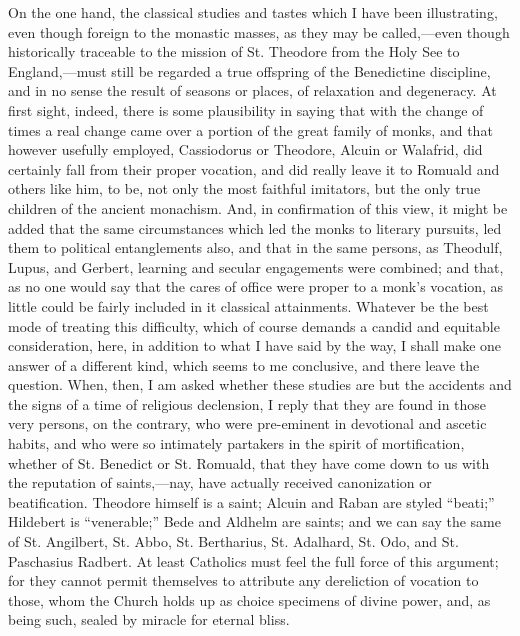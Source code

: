 On the one hand, the classical studies and tastes which I have been
illustrating, even though foreign to the monastic masses, as they may
be called,—even though historically traceable to the mission of St.
Theodore from the Holy See to England,—must still be regarded a true
offspring of the Benedictine discipline, and in no sense the result of
seasons or places, of relaxation and degeneracy. At first sight,
indeed, there is some plausibility in saying that with the change of
times a real change came over a portion of the great family of monks,
and that however usefully employed, Cassiodorus or Theodore, Alcuin or
Walafrid, did certainly fall from their proper vocation, and did
really leave it to Romuald and others like him, to be, not only the
most faithful imitators, but the only true children of the ancient
monachism. And, in confirmation of this view, it might be added that
the same circumstances which led the monks to literary pursuits, led
them to political entanglements also, and that in the same persons, as
Theodulf, Lupus, and Gerbert, learning and secular engagements were
combined; and that, as no one would say that the cares of office were
proper to a monk's vocation, as little could be fairly included
in it classical attainments. Whatever be the best mode of treating
this difficulty, which of course demands a candid and equitable
consideration, here, in addition to what I have said by the way, I
shall make one answer of a different kind, which seems to me
conclusive, and there leave the question. When, then, I am asked
whether these studies are but the accidents and the signs of a time of
religious declension, I reply that they are found in those very
persons, on the contrary, who were pre-eminent in devotional and
ascetic habits, and who were so intimately partakers in the spirit of
mortification, whether of St. Benedict or St. Romuald, that they have
come down to us with the reputation of saints,—nay, have actually
received canonization or beatification. Theodore himself is a saint;
Alcuin and Raban are styled ``beati;'' Hildebert is
``venerable;'' Bede and Aldhelm are saints; and we can say the
same of St. Angilbert, St. Abbo, St. Bertharius, St. Adalhard, St. Odo,
and St. Paschasius Radbert. At least Catholics must feel the full
force of this argument; for they cannot permit themselves to attribute
any dereliction of vocation to those, whom the Church holds up as
choice specimens of divine power, and, as being such, sealed by
miracle for eternal bliss.

